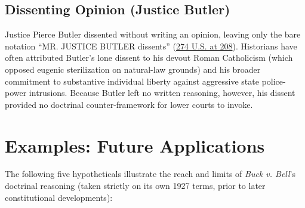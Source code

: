 \documentclass[12pt]{article}
\begin{document}
\subsection{Dissenting Opinion (Justice Butler)}

Justice Pierce Butler dissented without writing an opinion, leaving only the bare notation ``MR. JUSTICE BUTLER dissents'' (\href{https://supreme.justia.com/cases/federal/us/274/200/}{274 U.S. at 208}). Historians have often attributed Butler's lone dissent to his devout Roman Catholicism (which opposed eugenic sterilization on natural-law grounds) and his broader commitment to substantive individual liberty against aggressive state police-power intrusions. Because Butler left no written reasoning, however, his dissent provided no doctrinal counter-framework for lower courts to invoke.

\section{Examples: Future Applications}

The following five hypotheticals illustrate the reach and limits of \textit{Buck v. Bell}'s doctrinal reasoning (taken strictly on its own 1927 terms, prior to later constitutional developments):
\end{document}
